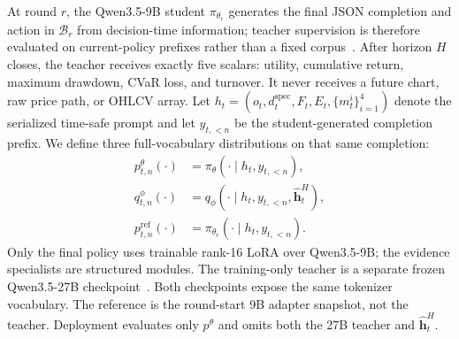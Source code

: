 At round $r$, the Qwen3.5-9B student $\pi_{\theta_r}$ generates the final JSON completion and action in $\mathcal B_r$ from decision-time information; teacher supervision is therefore evaluated on current-policy prefixes rather than a fixed corpus~\cite{gkd2024,topd2026}. After horizon $H$ closes, the teacher receives exactly five scalars: utility, cumulative return, maximum drawdown, CVaR loss, and turnover. It never receives a future chart, raw price path, or OHLCV array. Let $h_t=(o_t,d_t^{\mathrm{spec}},F_t,E_t,\{m_t^i\}_{i=1}^{4})$ denote the serialized time-safe prompt and let $y_{t,<n}$ be the student-generated completion prefix. We define three full-vocabulary distributions on that same completion:
\begin{equation}
\label{eq:teacher_student}
\begin{aligned}
p_{t,n}^{\theta}(\cdot)
&=\pi_{\theta}(\cdot\mid h_t,y_{t,<n}),\\
q_{t,n}^{\phi}(\cdot)
&=q_{\phi}(\cdot\mid h_t,y_{t,<n},
\widehat{\mathbf h}_t^H),\\
p_{t,n}^{\mathrm{ref}}(\cdot)
&=\pi_{\theta_r}(\cdot\mid h_t,y_{t,<n}).
\end{aligned}
\end{equation}
Only the final policy uses trainable rank-16 LoRA over Qwen3.5-9B; the evidence specialists are structured modules. The training-only teacher is a separate frozen Qwen3.5-27B checkpoint~\cite{qwen35_2026}. Both checkpoints expose the same tokenizer vocabulary. The reference is the round-start 9B adapter snapshot, not the teacher. Deployment evaluates only $p^\theta$ and omits both the 27B teacher and $\widehat{\mathbf h}_t^H$.

